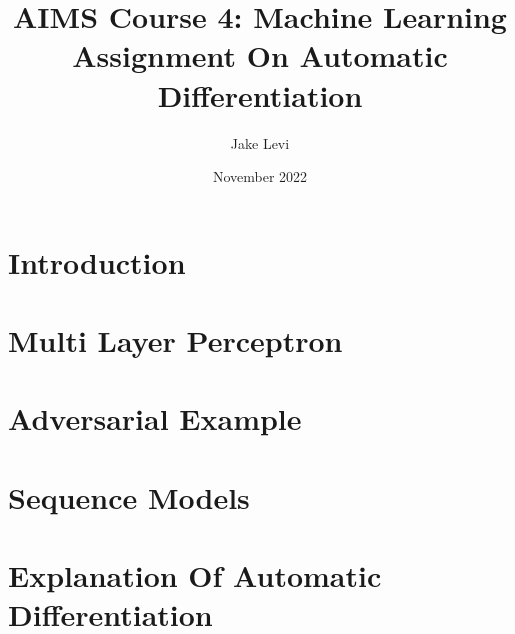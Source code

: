 \documentclass{article}
\title{
    AIMS Course 4: Machine Learning \\
    \large Assignment On Automatic Differentiation
}
\author{Jake Levi}
\date{November 2022}
\begin{document}
\maketitle
\section{Introduction} \label{section:intro}

\section{Multi Layer Perceptron}

\section{Adversarial Example}

\section{Sequence Models}



\pagebreak

\appendix
\section{Explanation Of Automatic Differentiation}\label{appendix:autodiff}
\end{document}

